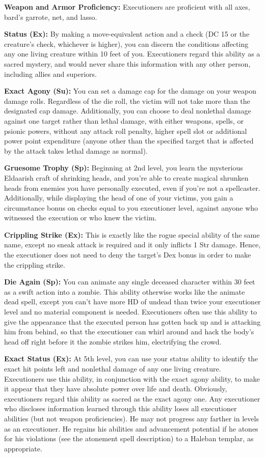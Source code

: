 {
\textbf{Weapon and Armor Proficiency:} Executioners are proficient with all axes, bard’s garrote, net, and lasso.

\textbf{Status (Ex):} By making a move-equivalent action and a  check (DC 15 or the creature’s  check, whichever is higher), you can discern the conditions affecting any one living creature within 10 feet of you. Executioners regard this ability as a sacred mystery, and would never share this information with any other person, including allies and superiors.

\textbf{Exact Agony (Su):} You can set a damage cap for the damage on your weapon damage rolls. Regardless of the die roll, the victim will not take more than the designated cap damage. Additionally, you can choose to deal nonlethal damage against one target rather than lethal damage, with either weapons, spells, or psionic powers, without any attack roll penalty, higher spell slot or additional power point expenditure (anyone other than the specified target that is affected by the attack takes lethal damage as normal).

\textbf{Gruesome Trophy (Sp):} Beginning at 2nd level, you learn the mysterious Eldaarish craft of shrinking heads, and you’re able to create magical shrunken heads from enemies you have personally executed, even if you’re not  a spellcaster. Additionally, while displaying the head of one of your victims, you gain a circumstance bonus on  checks equal to you executioner level, against anyone who witnessed the execution or who knew the victim.

\textbf{Crippling Strike (Ex):} This is exactly like the rogue special ability of the same name, except no sneak attack is required and it only inflicts 1 Str damage. Hence, the executioner does not need to deny the target’s Dex bonus in order to make the crippling strike.

\textbf{Die Again (Sp):} You can animate any single deceased character within 30 feet as a swift action into a zombie. This ability otherwise works like the animate dead spell, except you can’t have more HD of undead than twice your executioner level and no material component is needed. Executioners often use this ability to give the appearance that the executed person has gotten back up and is attacking him from behind, so that the executioner can whirl around and hack the body’s head off right  before it the zombie strikes him, electrifying the crowd.

\textbf{Exact Status (Ex):} At 5th level, you can use your status ability to identify the exact hit points left and nonlethal damage of any one living creature. Executioners use this ability, in conjunction with the exact agony ability, to make it appear that they have absolute power over life and death. Obviously, executioners regard this ability as sacred as the exact agony one. Any executioner who discloses information learned through this ability loses all executioner abilities (but not weapon proficiencies). He may not progress any farther in levels as an executioner. He regains his abilities and advancement potential if he atones for his violations (see the atonement spell description) to a Haleban templar, as appropriate.

}
